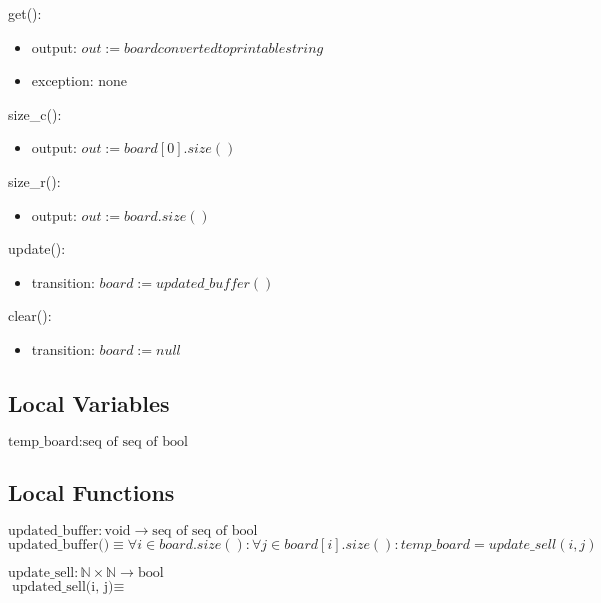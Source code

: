 \documentclass[12pt]{article}
\begin{document}
\noindent get():
\begin{itemize}
\item output: $out := board converted to printable string$
\item exception: none
\end{itemize}

\noindent size\_c():
\begin{itemize}
\item output:  $out := board[0].size()$

\end{itemize}

\noindent size\_r():
\begin{itemize}
\item output: $out := board.size()$

\end{itemize}

\noindent update():
\begin{itemize}
\item transition: $board := updated\_buffer()$
\end{itemize}

\noindent clear():
\begin{itemize}
\item transition: $board := null$
\end{itemize}


\subsection*{Local Variables}

\noindent $\text{temp\_board} : \text{seq of seq of bool}$

\subsection*{Local Functions}

\noindent $\text{updated\_buffer} : \text{void} \rightarrow \text{seq of seq of bool}$\\
\noindent $\text{updated\_buffer()} \equiv \forall i \in board.size() : \forall j \in board[i].size() : temp\_board = update\_sell(i ,j)$

\noindent $\text{update\_sell} : \mathbb{N} \times \mathbb{N} \rightarrow \text{bool}$\\
\noindent $\text{updated\_sell(i, j)} \equiv $
\end{document}
